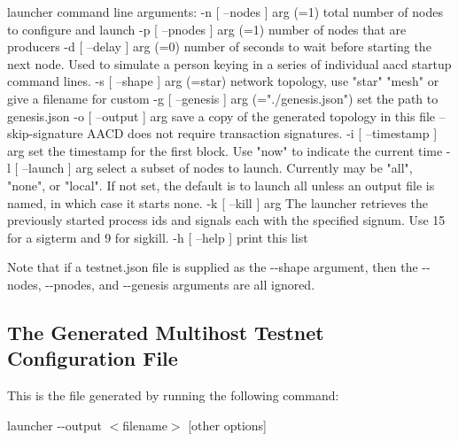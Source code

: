 \begin{DoxyCode}
launcher command line arguments:
  -n [ --nodes ] arg (=1)               total number of nodes to configure and 
                                        launch
  -p [ --pnodes ] arg (=1)              number of nodes that are producers
  -d [ --delay ] arg (=0)               number of seconds to wait before starting the next node. Used to
       simulate a person keying in a series of individual aacd startup command lines.
  -s [ --shape ] arg (=star)            network topology, use "star" 
                                        "mesh" or give a filename for custom
  -g [ --genesis ] arg (="./genesis.json")
                                        set the path to genesis.json
  -o [ --output ] arg                   save a copy of the generated topology 
                                        in this file
  --skip-signature                      AACD does not require transaction 
                                        signatures.
  -i [ --timestamp ] arg                set the timestamp for the first block. 
                                        Use "now" to indicate the current time
  -l [ --launch ] arg                   select a subset of nodes to launch. 
                                        Currently may be "all", "none", or 
                                        "local". If not set, the default is to 
                                        launch all unless an output file is 
                                        named, in which case it starts none.
  -k [ --kill ] arg                     The launcher retrieves the previously 
                                        started process ids and signals each with the specified signum. Use
       15 for a sigterm and 9 for sigkill.                              
  -h [ --help ]                         print this list
\end{DoxyCode}
 Note that if a testnet.\+json file is supplied as the {\ttfamily -\/-\/shape} argument, then the {\ttfamily -\/-\/nodes}, {\ttfamily -\/-\/pnodes}, and {\ttfamily -\/-\/genesis} arguments are all ignored.

\subsection*{The Generated Multihost Testnet Configuration File}

This is the file generated by running the following command\+:

{\ttfamily launcher -\/-\/output $<$filename$>$ \mbox{[}other options\mbox{]}}

